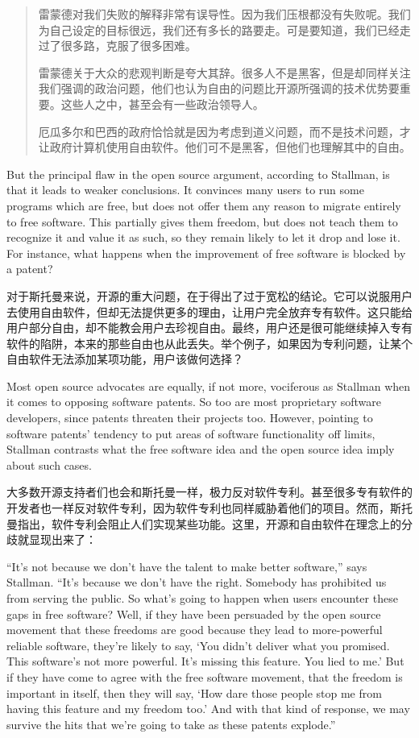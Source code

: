 \ifdefined\chs
\begin{quote}
雷蒙德对我们失败的解释非常有误导性。因为我们压根都没有失败呢。我们为自己设定的目标很远，我们还有多长的路要走。可是要知道，我们已经走过了很多路，克服了很多困难。

雷蒙德关于大众的悲观判断是夸大其辞。很多人不是黑客，但是却同样关注我们强调的政治问题，他们也认为自由的问题比开源所强调的技术优势要重要。这些人之中，甚至会有一些政治领导人。

厄瓜多尔和巴西的政府恰恰就是因为考虑到道义问题，而不是技术问题，才让政府计算机使用自由软件。他们可不是黑客，但他们也理解其中的自由。

\end{quote}
\fi

\ifdefined\eng
But the principal flaw in the open source argument, according to Stallman, is that it leads to weaker conclusions.  It convinces many users to run some programs which are free, but does not offer them any reason to migrate entirely to free software.  This partially gives them freedom, but does not teach them to recognize it and value it as such, so they remain likely to let it drop and lose it.  For instance, what happens when the improvement of free software is blocked by a patent?
\fi

\ifdefined\chs
对于斯托曼来说，开源的重大问题，在于得出了过于宽松的结论。它可以说服用户去使用自由软件，但却无法提供更多的理由，让用户完全放弃专有软件。这只能给用户部分自由，却不能教会用户去珍视自由。最终，用户还是很可能继续掉入专有软件的陷阱，本来的那些自由也从此丢失。举个例子，如果因为专利问题，让某个自由软件无法添加某项功能，用户该做何选择？
\fi

\ifdefined\eng
Most open source advocates are equally, if not more, vociferous as Stallman when it comes to opposing software patents.  So too are most proprietary software developers, since patents threaten their projects too.  However, pointing to software patents' tendency to put areas of software functionality off limits, Stallman contrasts what the free software idea and the open source idea imply about such cases.
\fi

\ifdefined\chs
大多数开源支持者们也会和斯托曼一样，极力反对软件专利。甚至很多专有软件的开发者也一样反对软件专利，因为软件专利也同样威胁着他们的项目。然而，斯托曼指出，软件专利会阻止人们实现某些功能。这里，开源和自由软件在理念上的分歧就显现出来了：
\fi

\ifdefined\eng
``It's not because we don't have the talent to make better software,'' says Stallman. ``It's because we don't have the right. Somebody has prohibited us from serving the public. So what's going to happen when users encounter these gaps in free software? Well, if they have been persuaded by the open source movement that these freedoms are good because they lead to more-powerful reliable software, they're likely to say, `You didn't deliver what you promised. This software's not more powerful. It's missing this feature. You lied to me.' But if they have come to agree with the free software movement, that the freedom is important in itself, then they will say, `How dare those people stop me from having this feature and my freedom too.' And with that kind of response, we may survive the hits that we're going to take as these patents explode.''
\fi

